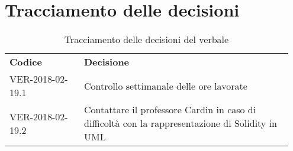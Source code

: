 \documentclass[VER-2018-02-19.tex]{subfiles}
\begin{document}
\section{Tracciamento delle decisioni}
\begin{table}[H]
	\begin{center}
		\begin{tabu} to 
			\tableHeaderStyle
			\textbf{Codice} & \textbf{Decisione} \\
			VER-2018-02-19.1 & Controllo settimanale delle ore lavorate \\
			VER-2018-02-19.2 & Contattare il professore Cardin in caso di difficoltà con la rappresentazione di Solidity in UML \\
		\end{tabu}
		\caption{Tracciamento delle decisioni del verbale}
	\end{center}
\end{table}
\end{document}
